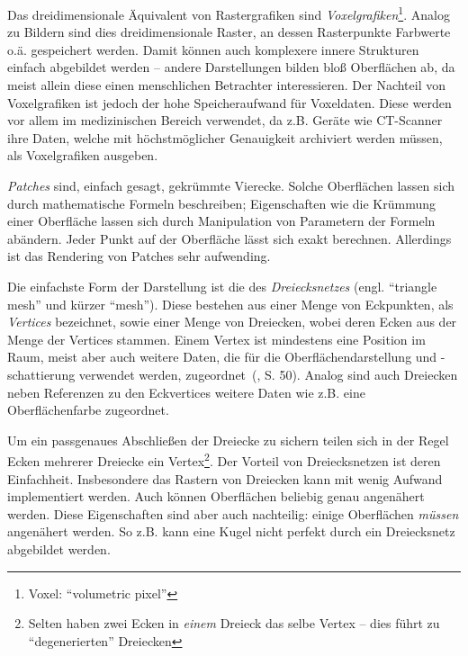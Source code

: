 \documentclass[twoside,a4paper,fleqn,12pt]{book}
\begin{document}
Das dreidimensionale Äquivalent von Rastergrafiken sind \emph{Voxelgrafiken}\footnote{Voxel: ``volumetric pixel''}. 
Analog zu Bildern sind dies dreidimensionale
Raster, an dessen Rasterpunkte Farbwerte o.ä. gespeichert werden. 
Damit können auch komplexere innere Strukturen einfach abgebildet werden -- andere Darstellungen bilden bloß
Oberflächen ab, da meist allein diese einen menschlichen Betrachter interessieren.
Der Nachteil von Voxelgrafiken ist jedoch der hohe Speicheraufwand für Voxeldaten. Diese werden
vor allem im medizinischen Bereich verwendet, da z.B. Geräte wie CT-Scanner ihre Daten, welche mit
höchstmöglicher Genauigkeit archiviert werden müssen, als Voxelgrafiken ausgeben.

\emph{Patches} sind, einfach gesagt, gekrümmte Vierecke. Solche Oberflächen lassen sich durch mathematische Formeln
beschreiben; Eigenschaften wie die Krümmung einer Oberfläche lassen sich durch Manipulation von Parametern der
Formeln abändern. Jeder Punkt auf der Oberfläche lässt sich exakt berechnen. Allerdings ist das Rendering von Patches
sehr aufwending.

Die einfachste Form der Darstellung ist die des \emph{Dreiecksnetzes} (engl. ``triangle mesh'' und kürzer ``mesh'').
 Diese bestehen aus einer Menge von Eckpunkten,
als \emph{Vertices} bezeichnet, sowie einer Menge von Dreiecken, wobei deren Ecken aus der Menge der Vertices stammen.
Einem Vertex ist mindestens eine Position im Raum, meist aber auch weitere Daten, die für die Oberflächendarstellung und
\mbox{-schattierung} verwendet werden,  zugeordnet~(\cite{watt_de}, S. 50).
Analog sind auch Dreiecken neben Referenzen zu den Eckvertices weitere Daten wie z.B. eine Oberflächenfarbe zugeordnet.

Um ein passgenaues Abschließen der Dreiecke zu sichern teilen sich in der Regel Ecken mehrerer Dreiecke ein
Vertex\footnote{Selten haben zwei Ecken in \emph{einem} Dreieck das selbe Vertex -- dies führt zu "`degenerierten"' Dreiecken}. 
Der Vorteil von Dreiecksnetzen ist deren Einfachheit. Insbesondere das Rastern von Dreiecken kann mit wenig Aufwand
implementiert werden. Auch können Oberflächen beliebig genau angenähert werden. Diese Eigenschaften sind aber auch
nachteilig: einige Oberflächen \emph{müssen} angenähert werden. So z.B. kann eine Kugel nicht perfekt durch ein Dreiecksnetz
abgebildet werden. 
\end{document}
